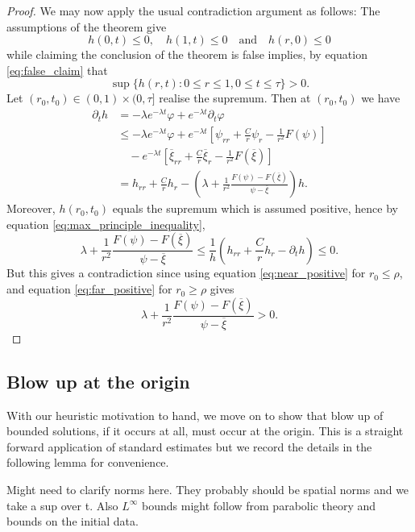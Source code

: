 \documentclass{amsart}
\begin{document}
\begin{proof}
We may now apply the usual contradiction argument as follows: The assumptions of the theorem give
\[
h(0, t) \leq 0, \quad h(1, t) \leq 0 \quad \text{and} \quad h(r, 0) \leq 0
\]
while claiming the conclusion of the theorem is false implies, by equation \eqref{eq:false_claim} that
\[
\sup \{h(r, t) : 0 \leq r \leq 1, 0 \leq t \leq \tau\} > 0.
\]
Let \((r_0, t_0) \in (0, 1) \times (0, \tau]\) realise the supremum. Then at \((r_0, t_0)\) we have
\begin{equation}
\label{eq:max_principle_inequality}
\begin{split}
\partial_t h &= - \lambda e^{-\lambda t} \varphi + e^{-\lambda t} \partial_t \varphi \\
&\leq  -\lambda e^{-\lambda t} \varphi + e^{-\lambda t} \left[\psi_{rr} + \frac{C}{r} \psi_r - \frac{1}{r^2} F(\psi)\right] \\
&\quad - e^{-\lambda t}\left[\overline{\xi}_{rr} + \frac{C}{r} \overline{\xi}_r - \frac{1}{r^2} F(\overline{\xi})\right] \\
&= h_{rr} + \frac{C}{r} h_r - \left(\lambda + \frac{1}{r^2} \frac{F(\psi) - F(\overline{\xi})}{\psi - \overline{\xi}}\right) h.
\end{split}
\end{equation}
Moreover, \(h(r_0, t_0)\) equals the supremum which is assumed positive, hence by equation \eqref{eq:max_principle_inequality},
\[
\lambda + \frac{1}{r^2} \frac{F(\psi) - F(\overline{\xi})}{\psi - \overline{\xi}} \leq \frac{1}{h} \left(h_{rr} + \frac{C}{r} h_r - \partial_t h\right) \leq 0.
\]
But this gives a contradiction since using equation \eqref{eq:near_positive} for \(r_0 \leq \rho\), and equation \eqref{eq:far_positive} for \(r_0 \geq \rho\) gives
\[
\lambda + \frac{1}{r^2} \frac{F(\psi) - F(\overline{\xi})}{\psi - \overline{\xi}} > 0.
\]
\end{proof}

\subsection{Blow up at the origin}
\label{subsec:origin_blowup}

With our heuristic motivation to hand, we move on to show that blow up of bounded solutions, if it occurs at all, must occur at the origin. This is a straight forward application of standard estimates \cite[Theorem 10.1]{Ladyzhenskaja:/1967} but we record the details in the following lemma for convenience.

{\color{red} Might need to clarify norms here. They probably should be spatial norms and we take a sup over t. Also $L^{\infty}$ bounds might follow from parabolic theory and bounds on the initial data.}
\end{document}

